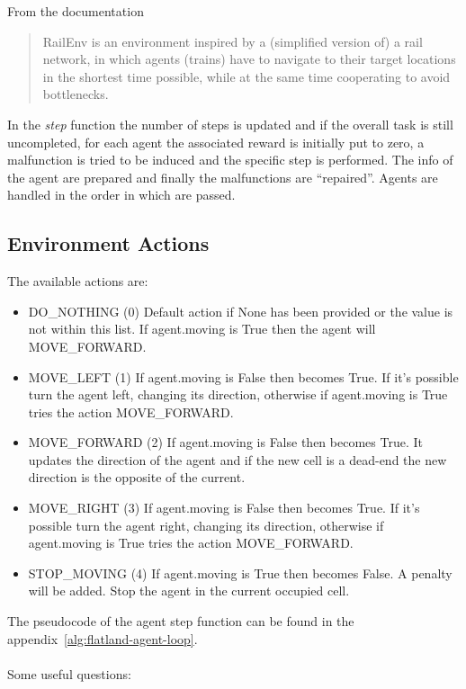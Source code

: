 \documentclass[11pt, a4paper, hidelinks]{report}
\begin{document}
From the documentation
\begin{quotation}
	RailEnv is an environment inspired by a (simplified version of) a rail
    network, in which agents (trains) have to navigate to their target
    locations in the shortest time possible, while at the same time cooperating
    to avoid bottlenecks.
\end{quotation}

In the \textit{step} function the number of steps is updated and if the overall task is still uncompleted, for each agent the associated reward is initially put to zero, a malfunction is tried to be induced and the specific step is performed.
The info of the agent are prepared and finally the malfunctions are ``repaired''.
Agents are handled in the order in which are passed.

\subsection{Environment Actions}\label{subsec:environment-actions}
The available actions are:
\begin{itemize}
	\item DO\_NOTHING (0) Default action if None has been provided or the value is not within this list.
If agent.moving is True then the agent will MOVE\_FORWARD\@.
    \item MOVE\_LEFT (1) If agent.moving is False then becomes True.
If it's possible turn the agent left, changing its direction, otherwise if agent.moving is True tries the action MOVE\_FORWARD\@.
    \item MOVE\_FORWARD (2) If agent.moving is False then becomes True.
It updates the direction of the agent and if the new cell is a dead-end the new direction is the opposite of the current.
    \item MOVE\_RIGHT (3) If agent.moving is False then becomes True.
If it's possible turn the agent right, changing its direction, otherwise if agent.moving is True tries the action MOVE\_FORWARD\@.
    \item STOP\_MOVING (4) If agent.moving is True then becomes False.
A penalty will be added.
Stop the agent in the current occupied cell.
\end{itemize}
The pseudocode of the agent step function can be found in the appendix~\ref{alg:flatland-agent-loop}.
\\
\\
Some useful questions:
\end{document}

